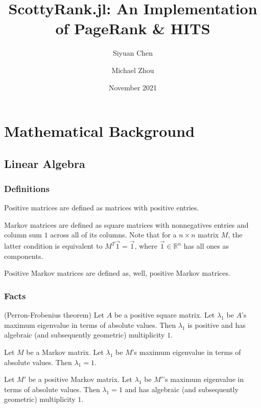 \documentclass[12pt, titlepage, twoside]{amsart}
\newcommand{\R}{\ensuremath{\mathbb R}}
\begin{document}
\title[ScottyRank.jl]{ScottyRank.jl: An Implementation of PageRank \& HITS}

\author{Siyuan Chen}
\author{Michael Zhou}
\date{November 2021}

\maketitle

\section{Mathematical Background}

\subsection{Linear Algebra}

\subsubsection{Definitions}

Positive matrices are defined as matrices with positive entries.

Markov matrices are defined as square matrices with nonnegatives entries and column sum $1$ across all of its columns.
Note that for a $n\times n$ matrix $M$, the latter condition is equivalent to $M^T\vec{1} = \vec{1}$,
where $\vec{1}\in\R^n$ has all ones as components.

Positive Markov matrices are defined as, well, positive Markov matrices.

\subsubsection{Facts}

(Perron-Frobenius theorem)
Let $A$ be a positive square matrix.
Let $\lambda_1$ be $A$'s maximum eigenvalue in terms of absolute values.
Then $\lambda_1$ is positive and has algebraic (and subsequently geometric) multiplicity $1$.

Let $M$ be a Markov matrix.
Let $\lambda_1$ be $M$'s maximum eigenvalue in terms of absolute values.
Then $\lambda_1 = 1$.

Let $M'$ be a positive Markov matrix.
Let $\lambda_1$ be $M'$'s maximum eigenvalue in terms of absolute values.
Then $\lambda_1 = 1$ and has algebraic (and subsequently geometric) multiplicity $1$.
\end{document}

